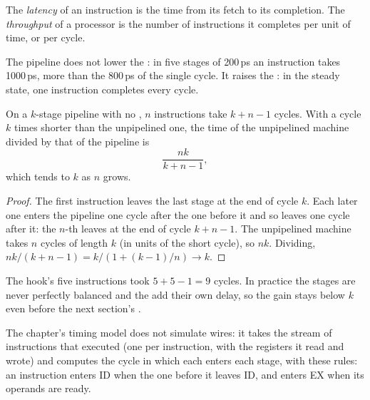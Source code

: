 \begin{definition}\label{def:b2:processor-and-pipelining:throughput}
The \emph{latency} of an instruction is the time from its fetch to its
completion. The \emph{throughput} of a processor is the number of instructions it completes per
unit of time, or per cycle.
\end{definition}

The pipeline does not lower the : in five stages of 200\,ps an instruction takes 1000\,ps, more than the
800\,ps of the single cycle. It raises the : in the steady state, one instruction completes every cycle.

\begin{proposition}\label{prop:b2:processor-and-pipelining:speedup}
On a $k$-stage pipeline with no , $n$ instructions take $k + n - 1$ cycles. With a cycle $k$ times shorter than
the unpipelined one, the time of the unpipelined machine divided by that of the pipeline is
\[
\frac{nk}{k + n - 1},
\]
which tends to $k$ as $n$ grows.
\end{proposition}

\begin{proof}
The first instruction leaves the last stage at the end of cycle $k$. Each later one enters the pipeline one cycle
after the one before it and so leaves one cycle after it: the $n$-th leaves at the end of cycle $k + n - 1$. The
unpipelined machine takes $n$ cycles of length $k$ (in units of the short cycle), so $nk$. Dividing,
$nk/(k + n - 1) = k / (1 + (k - 1)/n) \to k$.
\end{proof}

The hook's five instructions took $5 + 5 - 1 = 9$ cycles. In practice the stages are never perfectly balanced and
the  add their own delay, so the gain stays below $k$ even before the next section's .

The chapter's timing model  does not simulate wires: it takes the stream of instructions that
 executed (one  per instruction, with the registers it read and wrote) and computes the cycle in
which each enters each stage, with these rules: an instruction enters ID when the one before it leaves ID, and enters
EX when its operands are ready.


